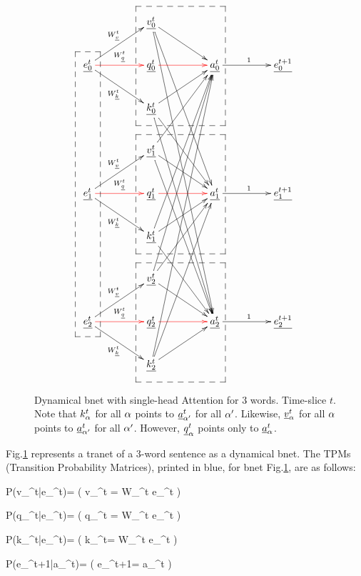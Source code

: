 \begin{figure}[!h]\centering
$$\xymatrix@C=4pc{
&{\underline{v_0^t}}\ar[dr]\ar[ddddr]\ar[dddddddr]&&
\\
{\underline{e_0^t}}\ar[dr]_{W_{\rvk}^t}\ar@[red][r]^{W_{\rvq}^t}\ar[ur]^{W_{\rvv}^t}&{\underline{q_0^t}}\ar@[red][r]&{\underline{a_0^t}}\ar[r]^{1}&{\underline{e_0^{t+1}}}
\\
&{\underline{k_0^t}}\ar[ur]\ar[ddr]\ar[dddddr]&&
\\
&{\underline{v_1^t}}\ar[uur]\ar[dr]\ar[ddddr]&&
\\
{\underline{e_1^t}}\ar[dr]_{W_{\rvk}^t}\ar@[red][r]^{W_{\rvq}^t}\ar[ur]^{W_{\rvv}^t}&{\underline{q_1^t}}\ar@[red][r]&{\underline{a_1^t}}\ar[r]^{1}&{\underline{e_1^{t+1}}}
\\
&{\underline{k_1^t}}\ar[uuuur]\ar[ur]\ar[ddr]&&
\\
&{\underline{v_2^t}}\ar[uuuuur]\ar[uur]\ar[dr]&&
\\
{\underline{e_2^t}}\ar[dr]_{W_{\rvk}^t}\ar@[red][r]^{W_{\rvq}^t}\ar[ur]^{W_{\rvv}^t}&{\underline{q_2^t}}\ar@[red][r]&{\underline{a_2^t}}\ar[r]^{1}&{\underline{e_2^{t+1}}}
\\
&{\underline{k_2^t}}\ar[uuuuuuur]\ar[uuuur]\ar[ur]&&
\save
\POS"2,1"."8,1"."2,1"."8,1"!C*+<1.0em>\frm{--}
\POS"1,2"."3,2"."1,3"."3,3"!C*+<1.5em>\frm{--}
\POS"4,2"."6,2"."4,3"."6,3"!C*+<1.5em>\frm{--}
\POS"7,2"."9,2"."7,3"."9,3"!C*+<1.5em>\frm{--}
\restore
}$$
\caption{Dynamical bnet  with single-head Attention for 3 words. Time-slice $t$.
Note that $k_\alpha^t$
for all $\alpha$
points to $\rva^t_{\alp'}$ for all ${\alpha'}$.
Likewise,
$\rvv_\alp^t$
for all $\alpha$
points to $\rva^t_{\alp'}$ for all ${\alpha'}$.
However,
$\rvq_\alp^t$
points only to $\rva^t_\alp$.
}
\label{fig-transformer-full3}
\end{figure}

Fig.\ref{fig-transformer-full3}
represents a tranet
of a 3-word sentence as a dynamical bnet.
The TPMs
(Transition Probability Matrices),
printed in blue,
for bnet
Fig.\ref{fig-transformer-full3},
are as follows:


\beq\color{blue}
P(v_\alp^t|e_\alp^t)=
\indi(\;\;\;
v_\alp^t = W_\rvv^t e_\alp^t
\;\;\;)
\eeq

\beq\color{blue}
P(q_\alp^t|e_\alp^t)=
\indi(\;\;\;
q_\alp^t = W_\rvq^t e_\alp^t
\;\;\;)
\eeq

\beq\color{blue}
P(k_\alp^t|e_\alp^t)=
\indi(\;\;\;
k_\alp^t= W_\rvk^t e_\alp^t
\;\;\;)
\eeq

\beq\color{blue}
P(e_\alp^{t+1}|a_\alp^t)=
\indi(\;\;\;
e_\alp^{t+1}= a_\alp^t
\;\;\;)
\eeq

